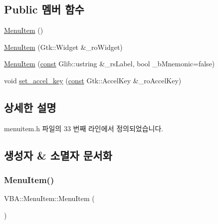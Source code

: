 \subsection*{Public 멤버 함수}
\begin{DoxyCompactItemize}
\item 
\mbox{\hyperlink{class_v_b_a_1_1_menu_item_aa6bdf69a7efedf0a825559f9371b7046}{Menu\+Item}} ()
\item 
\mbox{\hyperlink{class_v_b_a_1_1_menu_item_a4fd75eb019ae756ae60bc0699bf8b101}{Menu\+Item}} (Gtk\+::\+Widget \&\+\_\+ro\+Widget)
\item 
\mbox{\hyperlink{class_v_b_a_1_1_menu_item_afa20a05e88460b0b601c4cd2a4217298}{Menu\+Item}} (\mbox{\hyperlink{getopt1_8c_a2c212835823e3c54a8ab6d95c652660e}{const}} Glib\+::ustring \&\+\_\+rs\+Label, bool \+\_\+b\+Mnemonic=false)
\item 
void \mbox{\hyperlink{class_v_b_a_1_1_menu_item_aa29889bacc86ccf386e0225b7f03e5be}{set\+\_\+accel\+\_\+key}} (\mbox{\hyperlink{getopt1_8c_a2c212835823e3c54a8ab6d95c652660e}{const}} Gtk\+::\+Accel\+Key \&\+\_\+ro\+Accel\+Key)
\end{DoxyCompactItemize}


\subsection{상세한 설명}


menuitem.\+h 파일의 33 번째 라인에서 정의되었습니다.



\subsection{생성자 \& 소멸자 문서화}
\mbox{\label{class_v_b_a_1_1_menu_item_aa6bdf69a7efedf0a825559f9371b7046}} 
\subsubsection{\texorpdfstring{Menu\+Item()}{MenuItem()}\hspace{0.1cm}{\footnotesize\ttfamily [1/3]}}
{\footnotesize\ttfamily V\+B\+A\+::\+Menu\+Item\+::\+Menu\+Item (\begin{DoxyParamCaption}{ }\end{DoxyParamCaption})\hspace{0.3cm}{\ttfamily [inline]}}



